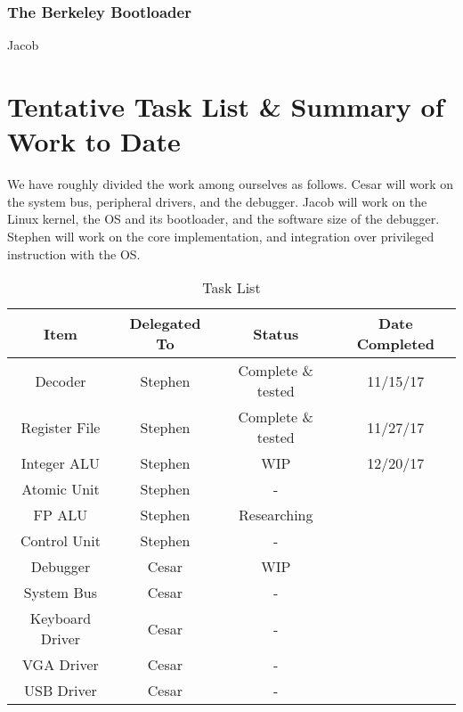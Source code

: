 \documentclass{article}
\begin{document}
    \subsubsection{The Berkeley Bootloader}
    Jacob


\section{Tentative Task List \& Summary of Work to Date}
We have roughly divided the work among ourselves as follows.  Cesar will work on the system bus, peripheral drivers, and the debugger.  Jacob will work on the Linux kernel, the OS and its bootloader, and the software size of the debugger.  Stephen will work on the core implementation, and integration over privileged instruction with the OS.

\begin{table}[ht]
\centering
\caption{Task List}
\label{my-label}
\begin{tabular}{|c|c|c|c|}
\hline
\textbf{Item}       & \textbf{Delegated To} & \textbf{Status}    & \textbf{Date Completed} \\ \hline
Decoder             & Stephen               & Complete \& tested & 11/15/17                \\ \hline
Register File       & Stephen               & Complete \& tested & 11/27/17                \\ \hline
Integer ALU         & Stephen               & WIP                & 12/20/17                \\ \hline
Atomic Unit         & Stephen               & -                  &                         \\ \hline
FP ALU              & Stephen               & Researching        &                         \\ \hline
Control Unit        & Stephen               & -                  &                         \\ \hline
Debugger            & Cesar                 & WIP                &                         \\ \hline
System Bus          & Cesar                 & -                  &                         \\ \hline
Keyboard Driver     & Cesar                 & -                  &                         \\ \hline
VGA Driver          & Cesar                 & -                  &                         \\ \hline
USB Driver          & Cesar                 & -                  &                         \\ \hline

\end{tabular}
\end{table}
\end{document}
